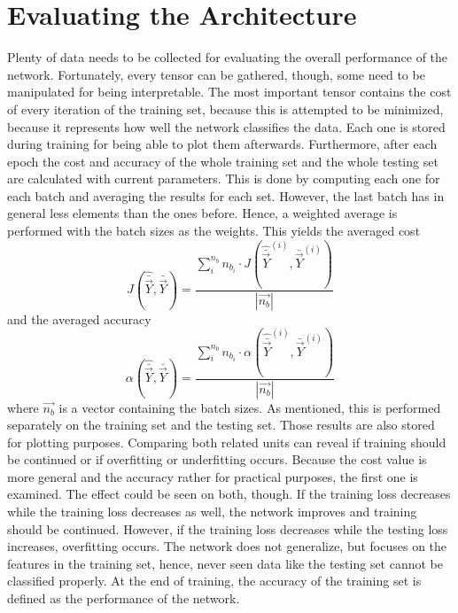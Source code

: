 \section{Evaluating the Architecture}
\label{sec:methods-evaluate}
Plenty of data needs to be collected for evaluating the overall performance of the network.
Fortunately, every tensor can be gathered, though, some need to be manipulated for being interpretable.
The most important tensor contains the cost of every iteration of the training set, because this is attempted to be minimized, because it represents how well the network classifies the data.
Each one is stored during training for being able to plot them afterwards.
Furthermore, after each epoch the cost and accuracy of the whole training set and the whole testing set are calculated with current parameters.
This is done by computing each one for each batch and averaging the results for each set.
However, the last batch has in general less elements than the ones before.
Hence, a weighted average is performed with the batch sizes as the weights.
This yields the averaged cost
\begin{equation}
	J\left(\hat{\bar{\vec{Y}}}, \bar{\vec{Y}}\right) =  \frac{\sum_{i}^{n_b} n_{b_i} \cdot J\left(\hat{\bar{\vec{Y}}}^{(i)}, \bar{\vec{Y}}^{(i)}\right)}{\left|\vec{n_b}\right|}
\end{equation}
and the averaged accuracy
\begin{equation}
	\alpha\left(\hat{\bar{\vec{Y}}}, \bar{\vec{Y}}\right) =  \frac{\sum_{i}^{n_b} n_{b_i} \cdot \alpha\left(\hat{\bar{\vec{Y}}}^{(i)}, \bar{\vec{Y}}^{(i)}\right)}{\left|\vec{n_b}\right|}
\end{equation}
where $\vec{n_b}$ is a vector containing the batch sizes.
As mentioned, this is performed separately on the training set and the testing set.
Those results are also stored for plotting purposes.
Comparing both related units can reveal if training should be continued or if overfitting or underfitting occurs.
Because the cost value is more general and the accuracy rather for practical purposes, the first one is examined.
The effect could be seen on both, though.
If the training loss decreases while the training loss decreases as well, the network improves and training should be continued.
However, if the training loss decreases while the testing loss increases, overfitting occurs.
The network does not generalize, but focuses on the features in the training set, hence, never seen data like the testing set cannot be classified properly.
At the end of training, the accuracy of the training set is defined as the performance of the network.
